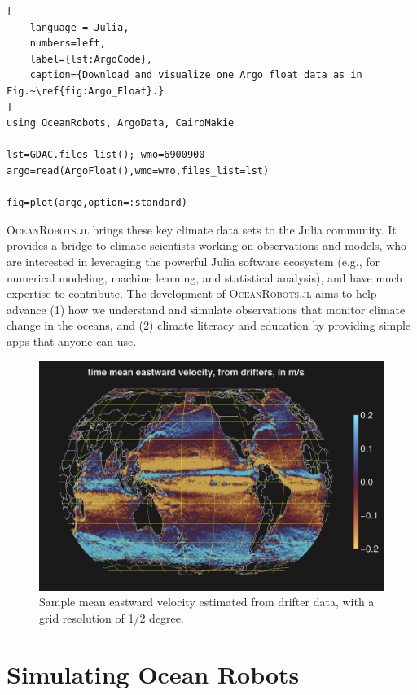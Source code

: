 \documentclass{juliacon}[12pt]
\newcommand{\pkg}[1]{{\small \textsc{#1}}}
\begin{document}
\begin{lstlisting}[
    language = Julia,
    numbers=left,
    label={lst:ArgoCode},
    caption={Download and visualize one Argo float data as in Fig.~\ref{fig:Argo_Float}.}
]
using OceanRobots, ArgoData, CairoMakie

lst=GDAC.files_list(); wmo=6900900
argo=read(ArgoFloat(),wmo=wmo,files_list=lst)

fig=plot(argo,option=:standard)
\end{lstlisting}

\pkg{OceanRobots.jl} brings these key climate data sets to the Julia community. It provides a bridge to climate scientists working on observations and models, who are interested in leveraging the powerful Julia software ecosystem (e.g., for numerical modeling, machine learning, and statistical analysis), and have much expertise to contribute. The development of \pkg{OceanRobots.jl} aims to help advance (1) how we understand and simulate observations that monitor climate change in the oceans, and (2) climate literacy and education by providing simple apps that anyone can use.

\begin{figure}[t]
\centerline{\includegraphics[width=\columnwidth]{figs/20240528_ve_mean.png}}
\caption{Sample mean eastward velocity estimated from drifter data, with a grid resolution of 1/2 degree.}
\label{fig:drifters_ve}
\end{figure}

\section{Simulating Ocean Robots}
\end{document}
